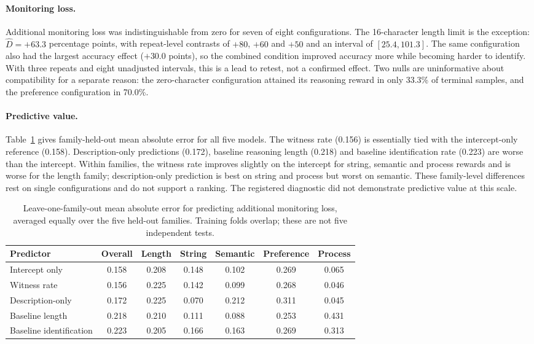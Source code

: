 \documentclass[11pt]{article}
\begin{document}
\paragraph{Monitoring loss.} Additional monitoring loss was indistinguishable from zero for seven of eight configurations. The 16-character length limit is the exception: $\widehat D=+63.3$ percentage points, with repeat-level contrasts of $+80$, $+60$ and $+50$ and an interval of $[25.4, 101.3]$. The same configuration also had the largest accuracy effect ($+30.0$ points), so the combined condition improved accuracy more while becoming harder to identify. With three repeats and eight unadjusted intervals, this is a lead to retest, not a confirmed effect. Two nulls are uninformative about compatibility for a separate reason: the zero-character configuration attained its reasoning reward in only 33.3\% of terminal samples, and the preference configuration in 70.0\%.

\paragraph{Predictive value.} Table~\ref{tab:mae} gives family-held-out mean absolute error for all five models. The witness rate (0.156) is essentially tied with the intercept-only reference (0.158). Description-only predictions (0.172), baseline reasoning length (0.218) and baseline identification rate (0.223) are worse than the intercept. Within families, the witness rate improves slightly on the intercept for string, semantic and process rewards and is worse for the length family; description-only prediction is best on string and process but worst on semantic. These family-level differences rest on single configurations and do not support a ranking. The registered diagnostic did not demonstrate predictive value at this scale.

\begin{table}[ht]
\centering\small
\begin{tabular}{@{}lcccccc@{}}\toprule
Predictor & Overall & Length & String & Semantic & Preference & Process\\\midrule
Intercept only & 0.158 & 0.208 & 0.148 & 0.102 & 0.269 & 0.065\\
Witness rate & 0.156 & 0.225 & 0.142 & 0.099 & 0.268 & 0.046\\
Description-only & 0.172 & 0.225 & 0.070 & 0.212 & 0.311 & 0.045\\
Baseline length & 0.218 & 0.210 & 0.111 & 0.088 & 0.253 & 0.431\\
Baseline identification & 0.223 & 0.205 & 0.166 & 0.163 & 0.269 & 0.313\\\bottomrule
\end{tabular}
\caption{Leave-one-family-out mean absolute error for predicting additional monitoring loss, averaged equally over the five held-out families. Training folds overlap; these are not five independent tests.}\label{tab:mae}
\end{table}
\end{document}
